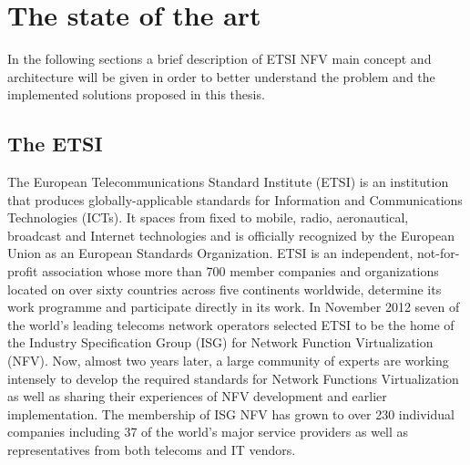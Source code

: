 \chapter{The state of the art}
\label{chap:State of the Art}
In the following sections a brief description of ETSI NFV main concept and architecture will be given in order to better understand the problem and the implemented solutions proposed in this thesis.

\section{The ETSI}
The European Telecommunications Standard Institute (ETSI) is an institution that produces globally-applicable standards for Information and Communications Technologies (ICTs). It spaces from fixed to mobile, radio, aeronautical, broadcast and Internet technologies and is officially recognized by the European Union as an European Standards Organization. ETSI is an independent, not-for-profit association whose more than 700 member companies and organizations located on over sixty countries across five continents worldwide, determine its work programme and participate directly in its work. In November 2012 seven of the world's leading telecoms network operators selected ETSI to be the home of the Industry Specification Group (ISG) for Network Function Virtualization (NFV). Now, almost two years later, a large community of experts are working intensely to develop the required standards for Network Functions Virtualization as well as sharing their experiences of NFV development and earlier implementation. The membership of ISG NFV has grown to over 230 individual companies including 37 of the world's major service providers as well as representatives from both telecoms and IT vendors.

